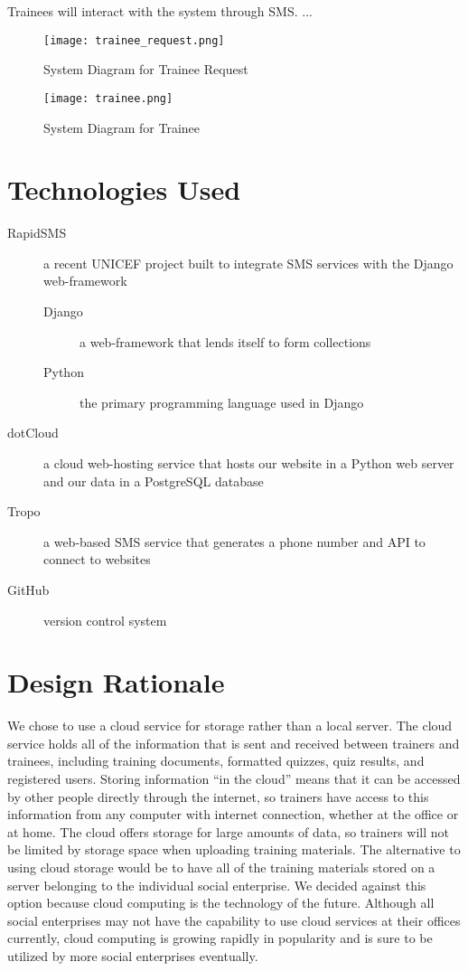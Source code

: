 Trainees will interact with the system through SMS. ...

\begin{figure}[H]
	\centering
	\texttt{[image: trainee\_request.png]}
	\caption{System Diagram for Trainee Request}
\end{figure}

\begin{figure}[H]
	\centering
	\texttt{[image: trainee.png]}
	\caption{System Diagram for Trainee}
\end{figure}

\section{Technologies Used}
\begin{description}
	\item[RapidSMS] a recent UNICEF project built to integrate SMS services with the Django web-framework
	\begin{description}
		\item[Django] a web-framework that lends itself to form collections
		\item[Python] the primary programming language used in Django
	\end{description}
	\item[dotCloud] a cloud web-hosting service that hosts our website in a Python web server and our data in a PostgreSQL database
	\item[Tropo] a web-based SMS service that generates a phone number and API to connect to websites
	\item[GitHub] version control system
\end{description}

\section{Design Rationale}

We chose to use a cloud service for storage rather than a local server. The cloud service holds all of the information that is sent and received between trainers and trainees, including training documents, formatted quizzes, quiz results, and registered users. Storing information “in the cloud” means that it can be accessed by other people directly through the internet, so trainers have access to this information from any computer with internet connection, whether at the office or at home. The cloud offers storage for large amounts of data, so trainers will not be limited by storage space when uploading training materials. The alternative to using cloud storage would be to have all of the training materials stored on a server belonging to the individual social enterprise. We decided against this option because cloud computing is the technology of the future. Although all social enterprises may not have the capability to use cloud services at their offices currently, cloud computing is growing rapidly in popularity and is sure to be utilized by more social enterprises eventually.

